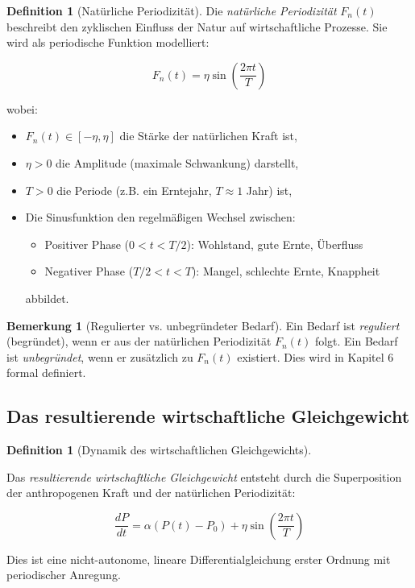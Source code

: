 \documentclass[a4paper, 12pt, twoside, openright]{report}
\theoremstyle{definition}
\newtheorem{definition}[theorem]{Definition}
\theoremstyle{definition}
\newtheorem{bemerkung}{Bemerkung}[chapter]
\begin{document}
\begin{definition}[Natürliche Periodizität]\label{def:periodizitaet}
    Die \emph{natürliche Periodizität} $F_n(t)$ beschreibt den zyklischen Einfluss der Natur auf wirtschaftliche Prozesse. Sie wird als periodische Funktion modelliert:
    
    \begin{equation}
        \boxed{F_n(t) = \eta \sin\left(\frac{2\pi t}{T}\right)}
        \label{eq:periodizitaet}
    \end{equation}
    
    wobei:
    \begin{itemize}
        \item $F_n(t) \in [-\eta, \eta]$ die Stärke der natürlichen Kraft ist,
        \item $\eta > 0$ die Amplitude (maximale Schwankung) darstellt,
        \item $T > 0$ die Periode (z.B. ein Erntejahr, $T \approx 1$ Jahr) ist,
        \item Die Sinusfunktion den regelmäßigen Wechsel zwischen:
        \begin{itemize}
            \item Positiver Phase ($0 < t < T/2$): Wohlstand, gute Ernte, Überfluss
            \item Negativer Phase ($T/2 < t < T$): Mangel, schlechte Ernte, Knappheit
        \end{itemize}
        abbildet.
    \end{itemize}
\end{definition}

\begin{bemerkung}[Regulierter vs. unbegründeter Bedarf]
    
    Ein Bedarf ist \emph{reguliert} (begründet), wenn er aus der natürlichen Periodizität $F_n(t)$ folgt. Ein Bedarf ist \emph{unbegründet}, wenn er zusätzlich zu $F_n(t)$ existiert. Dies wird in Kapitel 6 formal definiert.
\end{bemerkung}

\subsection{Das resultierende wirtschaftliche Gleichgewicht}

\begin{definition}[Dynamik des wirtschaftlichen Gleichgewichts]\label{def:gleichgewicht}
    
    Das \emph{resultierende wirtschaftliche Gleichgewicht} entsteht durch die Superposition der anthropogenen Kraft und der natürlichen Periodizität:
    
    \begin{equation}
        \boxed{\frac{dP}{dt} = \alpha(P(t) - P_0) + \eta \sin\left(\frac{2\pi t}{T}\right)}
        \label{eq:gleichgewicht_ode}
    \end{equation}
    
    Dies ist eine nicht-autonome, lineare Differentialgleichung erster Ordnung mit periodischer Anregung.
\end{definition}
\end{document}
